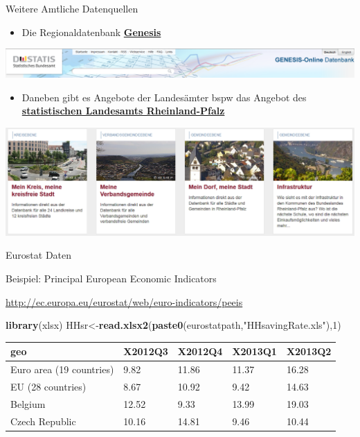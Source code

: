 \documentclass[ignorenonframetext,]{beamer}
\newenvironment{Shaded}{\begin{snugshade}}{\end{snugshade}}
\newcommand{\DecValTok}[1]{\textcolor[rgb]{0.27,0.67,0.26}{#1}}
\newcommand{\KeywordTok}[1]{\textcolor[rgb]{0.26,0.66,0.93}{\textbf{#1}}}
\newcommand{\NormalTok}[1]{\textcolor[rgb]{0.74,0.68,0.62}{#1}}
\newcommand{\StringTok}[1]{\textcolor[rgb]{0.02,0.61,0.04}{#1}}
\providecommand{\tightlist}{%
  \setlength{\itemsep}{0pt}\setlength{\parskip}{0pt}}
\begin{document}
\begin{frame}{Weitere Amtliche Datenquellen}
\protect\hypertarget{weitere-amtliche-datenquellen}{}

\begin{itemize}
\tightlist
\item
  Die Regionaldatenbank
  \href{https://www-genesis.destatis.de/genesis/online}{\textbf{Genesis}}
\end{itemize}

\includegraphics{figure/GENESIS_Datenbank.PNG}

\begin{itemize}
\tightlist
\item
  Daneben gibt es Angebote der Landesämter bspw das Angebot des
  \href{https://www.statistik.rlp.de/de/regional/meine-heimat/}{\textbf{statistischen
  Landesamts Rheinland-Pfalz}}
\end{itemize}

\includegraphics{figure/Meine_heimat.PNG}

\end{frame}

\begin{frame}[fragile]{Eurostat Daten}
\protect\hypertarget{eurostat-daten}{}

\begin{block}{Beispiel: Principal European Economic Indicators}

\url{http://ec.europa.eu/eurostat/web/euro-indicators/peeis}

\begin{Shaded}
\begin{Highlighting}[]
\KeywordTok{library}\NormalTok{(xlsx)}
\NormalTok{HHsr<-}\KeywordTok{read.xlsx2}\NormalTok{(}\KeywordTok{paste0}\NormalTok{(eurostatpath,}\StringTok{"HHsavingRate.xls"}\NormalTok{),}\DecValTok{1}\NormalTok{)}
\end{Highlighting}
\end{Shaded}

\begin{longtable}[]{@{}lllll@{}}
\toprule
geo & X2012Q3 & X2012Q4 & X2013Q1 & X2013Q2\tabularnewline
\midrule
\endhead
Euro area (19 countries) & 9.82 & 11.86 & 11.37 & 16.28\tabularnewline
EU (28 countries) & 8.67 & 10.92 & 9.42 & 14.63\tabularnewline
Belgium & 12.52 & 9.33 & 13.99 & 19.03\tabularnewline
Czech Republic & 10.16 & 14.81 & 9.46 & 10.44\tabularnewline
\bottomrule
\end{longtable}

\end{block}

\end{frame}
\end{document}
